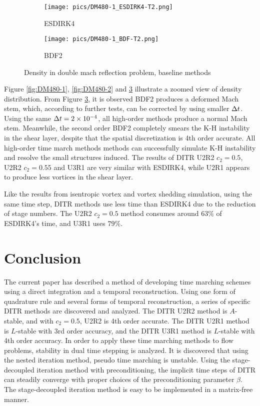 \documentclass[preprint,12pt]{elsarticle}
\begin{document}
\begin{figure}[htbp]
    \centering
    \begin{subfigure}{0.5\textwidth}
        \texttt{[image: pics/DM480-1\_ESDIRK4-T2.png]}
        \caption[]{ESDIRK4}
        \label{sfig:DM480_ESDIRK4}
    \end{subfigure}\hfill
    \begin{subfigure}{0.5\textwidth}
        \texttt{[image: pics/DM480-1\_BDF-T2.png]}
        \caption[]{BDF2}
        \label{sfig:DM480_BDF2}
    \end{subfigure}
    \caption{Density in double mach reflection problem, baseline methods}
    \label{fig:DM480-3}
\end{figure}

Figure \ref{fig:DM480-1}, \ref{fig:DM480-2} and \ref{fig:DM480-3}
illustrate a zoomed view of density distribution.
From Figure \ref{fig:DM480-3},
it is observed BDF2 produces
a deformed Mach stem, which, according
to further tests, can be
corrected by using smaller $\mathrm\Delta t$.
Using the same $\mathrm\Delta t= 2\times10^{-4}$,
all high-order methods produce a
normal Mach stem.
Meanwhile, the second order BDF2
completely smears the K-H instability
in the shear layer, despite that the spatial 
discretization is 4th order accurate.
All high-order time march methods methods can successfully
simulate K-H instability and resolve the
small structures induced.
The results of DITR U2R2 $c_2=0.5$, U2R2  $c_2=0.55$
and U3R1 are very similar with ESDIRK4, while U2R1
appears to produce less vortices in the shear layer.

Like the results from isentropic vortex and vortex shedding simulation,
using the same time step, DITR methods
use less time than ESDIRK4 due to the reduction of stage numbers.
The U2R2 $c_2=0.5$ method consumes around $63\%$ of ESDIRK4's time,
and U3R1 uses $79\%$.



\section{Conclusion}
\label{sec:Conc}

The current paper has described a method of 
developing time marching schemes using a 
direct integration and a temporal reconstruction.
Using one form of quadrature rule and several
forms of temporal reconstruction, a series of 
specific DITR methods are discovered and analyzed.
The DITR U2R2 method is $A$-stable, and with $c_2=0.5$, U2R2 is 4th order accurate.
The DITR U2R1 method is $L$-stable with 3rd order accuracy, and 
the DITR U3R1 method is $L$-stable with 4th order accuracy.
In order to apply these time marching methods to flow problems,
stability in dual time stepping is analyzed. 
It is discovered that using the nested iteration method, pseudo time marching is unstable.
Using the stage-decoupled iteration method with preconditioning,
the implicit time steps of DITR can steadily converge with proper choices of 
the preconditioning parameter $\beta$. 
The stage-decoupled iteration method is easy to be implemented in a 
matrix-free manner.
\end{document}

